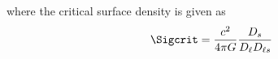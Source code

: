 where the critical surface density is given as
\begin{equation}
\Sigcrit = \frac{c^2}{4 \pi G} \frac{D_s}{D_\ell D_{\ell s}}
\end{equation}
  
  